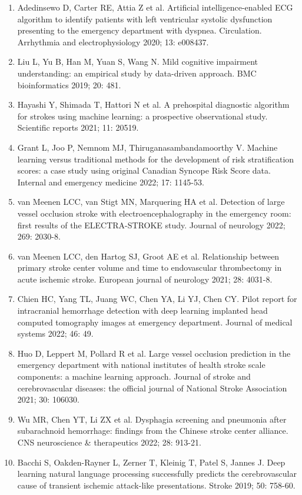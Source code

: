 {{\begin{enumerate}
    \item Adedinsewo D, Carter RE, Attia Z et al. Artificial intelligence-enabled ECG algorithm to identify patients with left ventricular systolic dysfunction presenting to the emergency department with dyspnea. Circulation. Arrhythmia and electrophysiology 2020; 13: e008437.
    \item Liu L, Yu B, Han M, Yuan S, Wang N. Mild cognitive impairment understanding: an empirical study by data-driven approach. BMC bioinformatics 2019; 20: 481.
    \item Hayashi Y, Shimada T, Hattori N et al. A prehospital diagnostic algorithm for strokes using machine learning: a prospective observational study. Scientific reports 2021; 11: 20519.
    \item Grant L, Joo P, Nemnom MJ, Thiruganasambandamoorthy V. Machine learning versus traditional methods for the development of risk stratification scores: a case study using original Canadian Syncope Risk Score data. Internal and emergency medicine 2022; 17: 1145-53.
    \item van Meenen LCC, van Stigt MN, Marquering HA et al. Detection of large vessel occlusion stroke with electroencephalography in the emergency room: first results of the ELECTRA-STROKE study. Journal of neurology 2022; 269: 2030-8.
    \item van Meenen LCC, den Hartog SJ, Groot AE et al. Relationship between primary stroke center volume and time to endovascular thrombectomy in acute ischemic stroke. European journal of neurology 2021; 28: 4031-8.
    \item Chien HC, Yang TL, Juang WC, Chen YA, Li YJ, Chen CY. Pilot report for intracranial hemorrhage detection with deep learning implanted head computed tomography images at emergency department. Journal of medical systems 2022; 46: 49.
    \item Huo D, Leppert M, Pollard R et al. Large vessel occlusion prediction in the emergency department with national institutes of health stroke scale components: a machine learning approach. Journal of stroke and cerebrovascular diseases: the official journal of National Stroke Association 2021; 30: 106030.
    \item Wu MR, Chen YT, Li ZX et al. Dysphagia screening and pneumonia after subarachnoid hemorrhage: findings from the Chinese stroke center alliance. CNS neuroscience \& therapeutics 2022; 28: 913-21.
    \item Bacchi S, Oakden-Rayner L, Zerner T, Kleinig T, Patel S, Jannes J. Deep learning natural language processing successfully predicts the cerebrovascular cause of transient ischemic attack-like presentations. Stroke 2019; 50: 758-60.

\end{enumerate}}}
